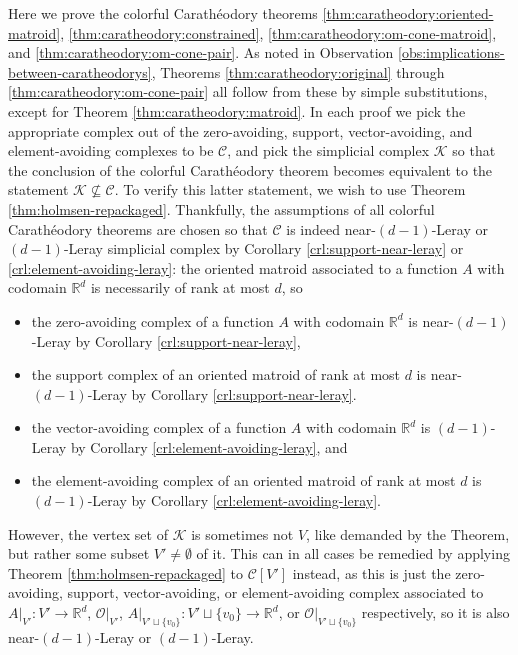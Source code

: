 \documentclass[a4paper,11pt,reqno, english]{amsart}
\theoremstyle{definition}
\theoremstyle{remark}
\newcommand\R{\mathbb R}
\begin{document}
Here we prove the colorful Carath\'eodory theorems \ref{thm:caratheodory:oriented-matroid}, \ref{thm:caratheodory:constrained}, \ref{thm:caratheodory:om-cone-matroid}, and \ref{thm:caratheodory:om-cone-pair}. As noted in Observation \ref{obs:implications-between-caratheodorys}, Theorems \ref{thm:caratheodory:original} through \ref{thm:caratheodory:om-cone-pair} all follow from these by simple substitutions, except for Theorem \ref{thm:caratheodory:matroid}. In each proof we pick the appropriate complex out of the zero-avoiding, support, vector-avoiding, and element-avoiding complexes to be $\mathscr{C}$, and pick the simplicial complex $\mathscr{K}$ so that the conclusion of the colorful Carath\'eodory theorem becomes equivalent to the statement $\mathscr{K}\nsubseteq\mathscr{C}$. To verify this latter statement, we wish to use Theorem \ref{thm:holmsen-repackaged}. Thankfully, the assumptions of all colorful Carath\'eodory theorems are chosen so that $\mathscr{C}$ is indeed near-$(d-1)$-Leray or $(d-1)$-Leray simplicial complex by Corollary \ref{crl:support-near-leray} or \ref{crl:element-avoiding-leray}: the oriented matroid associated to a function $A$ with codomain $\R^d$ is necessarily of rank at most $d$, so
\begin{itemize}
    \item the zero-avoiding complex of a function $A$ with codomain $\R^d$ is near-$(d-1)$-Leray by Corollary \ref{crl:support-near-leray},
    \item the support complex of an oriented matroid of rank at most $d$ is near-$(d-1)$-Leray by Corollary \ref{crl:support-near-leray}.
    \item the vector-avoiding complex of a function $A$ with codomain $\R^d$ is $(d-1)$-Leray by Corollary \ref{crl:element-avoiding-leray}, and
    \item the element-avoiding complex of an oriented matroid of rank at most $d$ is $(d-1)$-Leray by Corollary \ref{crl:element-avoiding-leray}.
\end{itemize}
However, the vertex set of $\mathscr{K}$ is sometimes not $V$, like demanded by the Theorem, but rather some subset $V'\neq\emptyset$ of it. This can in all cases be remedied by applying Theorem \ref{thm:holmsen-repackaged} to $\mathscr{C}[V']$ instead, as this is just the zero-avoiding, support, vector-avoiding, or element-avoiding complex associated to $A|_{V'}\colon{V'}\to\R^d$, $\mathscr{O}|_{V'}$, $A|_{V'\sqcup\{v_0\}}\colon{V'\sqcup\{v_0\}}\to\R^d$, or $\mathscr{O}|_{V'\sqcup\{v_0\}}$ respectively, so it is also near-$(d-1)$-Leray or $(d-1)$-Leray.
\end{document}
